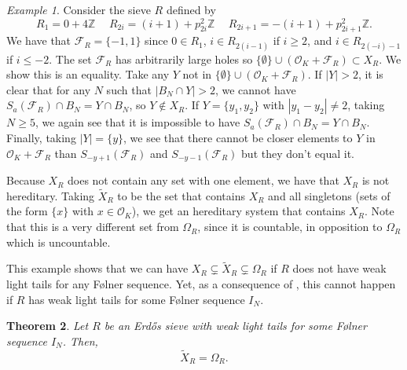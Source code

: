 \documentclass[a4paper,11pt,reqno]{amsart}
\theoremstyle{plain}
\newtheorem{theorem}{Theorem}[section]
\theoremstyle{remark}
\newtheorem{example}[theorem]{Example}
\newcommand{\z}{\mathbb{Z}}
\newcommand{\co}{\mathcal{O}}
\newcommand{\fr}{\mathcal{F}_R}
\begin{document}
			\begin{example}
				Consider the sieve $R$ defined by $$R_{1} = 0 + 4\z \hspace{15pt} R_{2i} = (i+1) + p_{2i}^2\z \hspace{15pt} R_{2i+1} = -(i+1) +  p_{2i+1}^2\z. $$ We have that $\fr = \{-1,1\}$ since $0 \in R_1$, $i \in R_{2(i-1)}$ if $i\geq 2$, and $i \in R_{2(-i)-1}$ if $i \leq -2$. The set $\fr$ has arbitrarily large holes so $\{\emptyset\} \cup (\co_K+ \fr) \subset X_R$. We show this is an equality. Take any $Y$ not in $\{\emptyset\} \cup (\co_K+ \fr)$. If $|Y| > 2$, it is clear that for any $N$ such that $|B_N \cap Y| >2$, we cannot have $S_a(\fr) \cap B_N = Y \cap B_N$, so $Y \not \in X_R$. If $Y = \{y_1,y_2\}$ with $|y_1 - y_2| \neq 2$, taking $N \geq 5$, we again see that it is impossible to have  $S_a(\fr) \cap B_N = Y \cap B_N$. Finally, taking $|Y|= \{y\}$, we see that there cannot be closer elements to $Y$ in $\co_K+\fr$  than $S_{-y+1}(\fr)$ and $S_{-y-1}(\fr)$ but they don't equal it.
				
				Because $X_R$ does not contain any set with one element, we have that $X_R$ is not hereditary. Taking $\widetilde{X}_R$ to be the set that contains $X_R$ and all singletons (sets of the form $\{x\}$ with $x \in \co_K$), we get an hereditary system that contains $X_R$. Note that this is a very different set from $\Omega_R$, since it is countable, in opposition to  $\Omega_R$ which is uncountable.    
			\end{example}
			
			This example shows that we can have $X_R \subsetneq \widetilde{X}_R \subsetneq \Omega_{R}$ if $R$ does not have weak light tails for any Følner sequence. Yet, as a consequence of  , this cannot happen if $R$ has weak light tails for some Følner sequence $I_N$. 
			
			\begin{theorem}
				\label{thm: tilde X R = Omega R}
				Let $R$ be an Erdős sieve with weak light tails for some Følner sequence $I_N$. Then, $$\widetilde{X}_R = \Omega_{R}.$$
			\end{theorem} 
			
\end{document}
